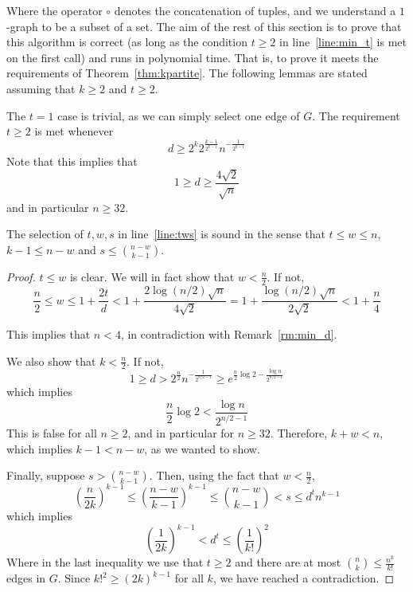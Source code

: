 Where the operator $\circ$ denotes the concatenation of tuples, and we
understand a $1$-graph to be a subset of a set.
The aim of the rest of this section is to prove that this algorithm is correct
(as long as the  condition $t \geq 2$ in line~\ref{line:min_t} is met on the first call)
and runs in polynomial time.
That is, to prove it meets the requirements of Theorem~\ref{thm:kpartite}.
The following lemmas are stated assuming that $k \geq 2$ and
$t \geq 2$.

\begin{remark}\label{rm:min_d}
    The $t=1$ case is trivial, as we can simply select one edge of $G$.
    The requirement $t \geq 2$ is met whenever
    \[
        d \geq 2^{k} 2^{\frac{k - 1}{2^{k-1}}} n^{-\frac{1}{2^{k-1}}}
    \]
    Note that this implies that
    \[
        1 \geq d \geq \frac{4\sqrt{2}}{\sqrt{n}}
    \]
    and in particular $n \geq 32$.
\end{remark}

\begin{lemma}\label{lm:sound}
    The selection of $t, w, s$ in line~\ref{line:tws} is sound in the sense that
    $t  \leq w \leq n$, $k - 1 \leq n - w$ and $s \leq \binom{n - w}{k - 1}$.
    \begin{proof}
        $t \leq w$ is clear.
        We will in fact show that $w < \frac{n}{2}$.
        If not,
        \[
            \frac{n}{2} \leq
            w \leq 1 + \frac{2t}{d} <
            1 + \frac{2 \log (n/2) \sqrt{n}}{4\sqrt{2}} =
            1 + \frac{\log(n/2) \sqrt{n}}{2\sqrt{2}} <
            1 + \frac{n}{4}
        \]

        This implies that $n < 4$, in contradiction with Remark~\ref{rm:min_d}.

        We also show that $k < \frac{n}{2}$.
        If not,
        \[
            1 \geq
            d >
            2^{\frac{n}{2}} n^{-\frac{1}{2^{n/2-1}}} \geq
            e^{\frac{n}{2} \log 2 - \frac{\log n}{2^{n/2-1}}}
        \]
        which implies
        \[
            \frac{n}{2} \log 2 < \frac{\log n}{2^{n/2-1}}
        \]
        This is false for all $n \geq 2$, and in particular for $n \geq 32$.
        Therefore, $ k + w < n$, which implies $k - 1 < n - w$,
        as we wanted to show.

        Finally, suppose $s > \binom{n - w}{k - 1}$.
        Then, using the fact that $w < \frac{n}{2}$,
        \[
            \left( \frac{n}{2k} \right)^{k-1} \leq
            \left( \frac{n-w}{k-1} \right)^{k-1} \leq
            \binom{n - w}{k - 1} < s \leq d^t n^{k-1}
        \]
        which implies
        \[
            \left( \frac{1}{2k} \right)^{k-1} < d^t \leq
            \left( \frac{1}{k!} \right)^2
        \]
        Where in the last inequality we use that $t \geq 2$ and there are at most
        $\binom{n}{k} \leq \frac{n^k}{k!}$ edges in $G$.
        Since $k!^2 \geq (2k)^{k-1}$ for all $k$,
        we have reached a contradiction. \qedhere

    \end{proof}
\end{lemma}


